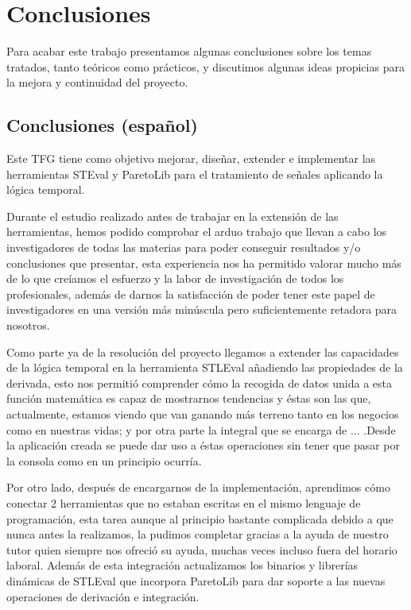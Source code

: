 \chapter{Conclusiones}
\label{cha:concl}
Para acabar este trabajo presentamos algunas conclusiones sobre los temas tratados, tanto teóricos como prácticos, y discutimos algunas ideas propicias para la mejora y continuidad del proyecto.
\section{Conclusiones (español)}

Este TFG tiene como objetivo mejorar, diseñar, extender e implementar las herramientas STEval y ParetoLib para el tratamiento de señales aplicando la lógica temporal.

Durante el estudio realizado antes de trabajar en la extensión de las herramientas, hemos podido comprobar el arduo trabajo que llevan a cabo los investigadores de todas las materias para poder conseguir resultados y/o conclusiones que presentar, esta experiencia nos ha permitido valorar mucho más de lo que creíamos el esfuerzo y la labor de investigación de todos los profesionales, además de darnos  la satisfacción de poder tener este papel de investigadores en una versión más minúscula pero suficientemente retadora para nosotros. 

Como parte ya de la resolución del proyecto llegamos a extender las capacidades de la lógica temporal en la herramienta STLEval añadiendo las propiedades de la derivada, esto nos permitió comprender cómo  la recogida de datos unida a esta función matemática es capaz de mostrarnos tendencias y éstas son las que, actualmente, estamos viendo que van ganando más terreno tanto en los negocios como en nuestras vidas; y por otra parte la integral que se encarga de ... .Desde la aplicación creada se puede dar uso a éstas operaciones sin tener que pasar por la consola como en un principio ocurría.

Por otro lado, después de encargarnos de la implementación, aprendimos cómo conectar 2 herramientas que no estaban escritas en el mismo lenguaje de programación, esta tarea aunque al principio bastante complicada debido a que nunca antes la realizamos, la pudimos completar gracias a la ayuda de nuestro tutor quien siempre nos ofreció su ayuda, muchas veces incluso fuera del horario laboral. Además de esta integración actualizamos los binarios y librerías dinámicas de STLEval que incorpora ParetoLib para dar soporte a las nuevas operaciones de derivación e integración. 

